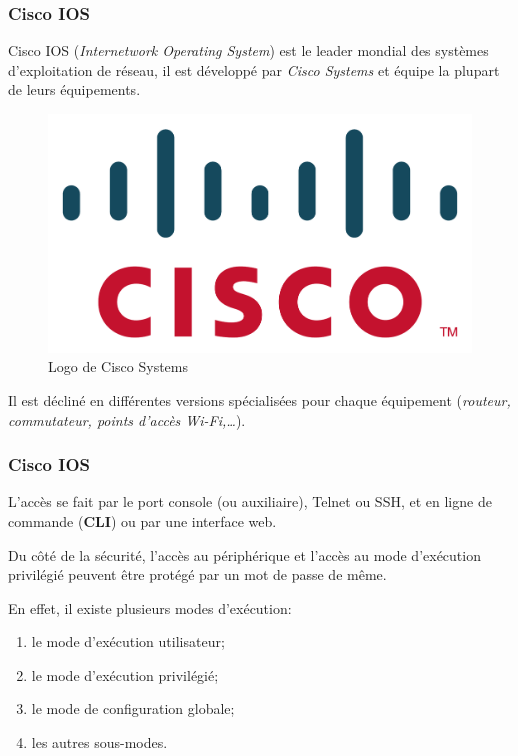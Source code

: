 \documentclass[aspectratio=169]{beamer}
\begin{document}
\begin{frame}
  \frametitle{Cisco IOS}
  Cisco IOS (\textit{Internetwork Operating System}) est le leader mondial des
  systèmes d'exploitation de réseau, il est développé par \textit{Cisco Systems}
  et équipe la plupart de leurs équipements.

  \begin{figure}[!h]
    \center
    \includegraphics[scale=0.2]
    {textures/images/others/Cisco_logo.pdf}
    \caption{Logo de Cisco Systems}
  \end{figure}

  Il est décliné en différentes versions spécialisées pour chaque équipement
  (\textit{routeur, commutateur, points d’accès Wi-Fi,…}).
\end{frame}

\begin{frame}
  \frametitle{Cisco IOS}
  L’accès se fait par le port console (ou auxiliaire), Telnet ou SSH, et en
  ligne de commande (\textbf{CLI}) ou par une interface web.

  \hspace{0.5cm}

  Du côté de la sécurité, l’accès au périphérique et l’accès au mode d’exécution
  privilégié peuvent être protégé par un mot de passe de même.

  \hspace{0.5cm}

  En effet, il existe plusieurs modes d’exécution:
  \begin{enumerate}
    \item le mode d’exécution utilisateur;
    \item le mode d’exécution privilégié;
    \item le mode de configuration globale;
    \item les autres sous-modes.
  \end{enumerate}

\end{frame}
\end{document}
